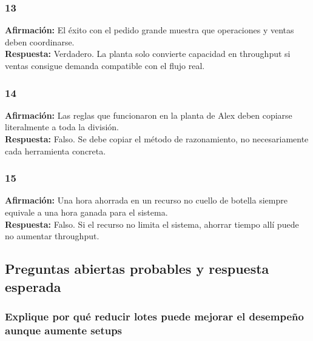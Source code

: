 \documentclass[
  11pt,
]{article}
\begin{document}
\hypertarget{section-12}{%
\subsubsection{13}\label{section-12}}

\textbf{Afirmación:} El éxito con el pedido grande muestra que
operaciones y ventas deben coordinarse.\\
\textbf{Respuesta:} Verdadero. La planta solo convierte capacidad en
throughput si ventas consigue demanda compatible con el flujo real.

\hypertarget{section-13}{%
\subsubsection{14}\label{section-13}}

\textbf{Afirmación:} Las reglas que funcionaron en la planta de Alex
deben copiarse literalmente a toda la división.\\
\textbf{Respuesta:} Falso. Se debe copiar el método de razonamiento, no
necesariamente cada herramienta concreta.

\hypertarget{section-14}{%
\subsubsection{15}\label{section-14}}

\textbf{Afirmación:} Una hora ahorrada en un recurso no cuello de
botella siempre equivale a una hora ganada para el sistema.\\
\textbf{Respuesta:} Falso. Si el recurso no limita el sistema, ahorrar
tiempo allí puede no aumentar throughput.

\hypertarget{preguntas-abiertas-probables-y-respuesta-esperada}{%
\subsection{Preguntas abiertas probables y respuesta
esperada}\label{preguntas-abiertas-probables-y-respuesta-esperada}}

\hypertarget{explique-por-quuxe9-reducir-lotes-puede-mejorar-el-desempeuxf1o-aunque-aumente-setups}{%
\subsubsection{Explique por qué reducir lotes puede mejorar el desempeño
aunque aumente
setups}\label{explique-por-quuxe9-reducir-lotes-puede-mejorar-el-desempeuxf1o-aunque-aumente-setups}}
\end{document}
